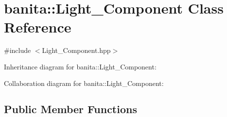\hypertarget{classbanita_1_1_light___component}{}\section{banita\+::Light\+\_\+\+Component Class Reference}
\label{classbanita_1_1_light___component}


{\ttfamily \#include $<$Light\+\_\+\+Component.\+hpp$>$}



Inheritance diagram for banita\+::Light\+\_\+\+Component\+:


Collaboration diagram for banita\+::Light\+\_\+\+Component\+:
\subsection*{Public Member Functions}
